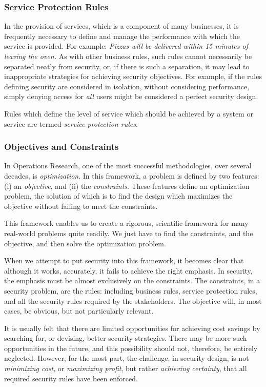 \subsubsection{Service Protection Rules}

In the provision of services, which is a component of many businesses, it is frequently necessary to define and manage the performance with which the service is provided. For example: {\em Pizzas will be delivered within 15 minutes of leaving the oven.} As with other business rules, such rules cannot necessarily be separated neatly from security, or, if there is such a separation, it may lead to inappropriate strategies for achieving security objectives. For example, if the rules defining security are considered in isolation, without considering performance, simply denying access for {\em all} users might be considered a perfect security design.

Rules which define the level of service which should be achieved by a system or service are termed {\em service protection rules}.

\subsubsection{Objectives and Constraints}

In Operations Research, one of the most successful methodologies, over several decades, is {\em optimization}. In this framework, a problem is defined by two features: (i) an {\em objective}, and (ii) the {\em constraints}. These features define an optimization problem, the solution of which is to find the design which maximizes the objective without failing to meet the constraints.

This framework enables us to create a rigorous, scientific framework for many real-world problems quite readily. We just have to find the constraints, and the objective, and then solve the optimization problem.

When we attempt to put security into this framework, it becomes clear that although it works, accurately, it fails to achieve the right emphasis. In security, the emphasis must be almost exclusively on the constraints. The constraints, in a security problem, are the rules: including business rules, service protection rules, and all the security rules required by the stakeholders. The objective will, in most cases, be obvious, but not particularly relevant.

It is usually felt that there are limited opportunities for achieving cost savings by searching for, or devising, better security strategies. There may be more such opportunities in the future, and this possibility should not, therefore, be entirely neglected. However, for the most part, the challenge, in security design, is not {\em minimizing cost}, or {\em maximizing profit}, but rather {\em achieving certainty}, that all required security rules have been enforced.


